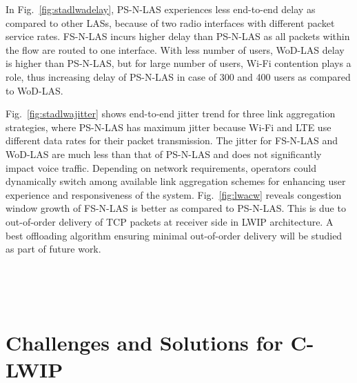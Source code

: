 \documentclass[conference]{IEEEtran}
\begin{document}
In Fig.~\ref{fig:stadlwadelay}, PS-N-LAS experiences less end-to-end delay as compared to other LASs, because of two radio interfaces with different packet service rates. FS-N-LAS incurs higher delay than PS-N-LAS as all packets within the flow are routed to one interface. With less number of users, WoD-LAS delay is higher than PS-N-LAS, but for large number of users, Wi-Fi contention plays a role, thus increasing delay of PS-N-LAS in case of 300 and 400 users as compared to WoD-LAS. 

Fig.~\ref{fig:stadlwajitter} shows end-to-end jitter trend for three link aggregation strategies, where PS-N-LAS has maximum jitter because Wi-Fi and LTE use different data rates for their packet transmission. The jitter for FS-N-LAS and WoD-LAS are much less than that of PS-N-LAS and does not significantly impact voice traffic. Depending on network requirements, operators could dynamically switch among available link aggregation schemes for enhancing user experience and responsiveness of the system. Fig.~\ref{fig:lwacw} reveals congestion window growth of FS-N-LAS is better as compared to PS-N-LAS. This is due to out-of-order delivery of TCP packets at receiver side in LWIP architecture. A best offloading algorithm ensuring minimal out-of-order delivery will be studied as part of future work.
\begin{figure*}[t]
 \vspace{-0.17cm}
\caption{Delay of Voice Traffic in Indoor Stadium with 10 C-LWIP Nodes}
\label{fig:stadlwadelay}
    \vspace{-0.3cm}
\endminipage\hfill
~
 \vspace{-0.17cm}
\caption{Jitter of Voice Traffic in Indoor Stadium with 10 C-LWIP Nodes}
\label{fig:stadlwajitter}
    \vspace{-0.3cm}
\endminipage\hfill
~
 \vspace{-0.17cm}
\caption{Variation of TCP Congestion Window for FTP traffic flows}
\label{fig:lwacw}
    \vspace{-0.3cm}
\endminipage\hfill
\end{figure*}
\section{Challenges and Solutions for C-LWIP}
\end{document}
